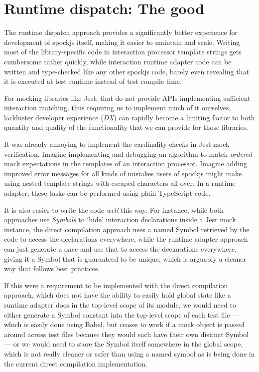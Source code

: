 \section{Runtime dispatch: The good}
The runtime dispatch approach
provides a significantly better experience
for development of spockjs itself,
making it easier to maintain and scale.
Writing most of the library-specific code
in interaction processor template strings
gets cumbersome rather quickly,
while interaction runtime adapter code
can be written and type-checked
like any other spockjs code,
barely even revealing that
it is executed at test runtime
instead of test compile time.

For mocking libraries like Jest,
that do not provide APIs
implementing sufficient interaction matching,
thus requiring us to implement much of it ourselves,
lackluster developer experience (\textit{DX})
can rapidly become a limiting factor to both quantity and quality
of the functionality that we can provide for those libraries.

It was already annoying to implement
the cardinality checks in Jest mock verification.
Imagine implementing and debugging an algorithm
to match \textit{ordered} mock expectations
in the templates of an interaction processor.
Imagine adding improved error messages for
all kinds of mistakes users of spockjs might make
using nested template strings
with escaped characters all over.
In a runtime adapter,
these tasks can be performed
using plain TypeScript code.

It is also easier to write the code \textit{well} this way.
For instance, while both approaches use \textit{Symbols} \autocite{MdnSymbol}
to `hide' interaction declarations inside a Jest mock instance,
the direct compilation approach uses
a named Symbol retrieved by the code
to access the declarations everywhere,
while the runtime adapter approach can just
generate a  once and use that
to access the declarations everywhere,
giving it a Symbol that is guaranteed to be unique,
which is arguably a cleaner way that follows best practices.

If this were a requirement to be implemented with the direct compilation approach,
which does not have the ability to easily hold global state
like a runtime adapter does in the top-level scope of its module,
we would need to either generate a Symbol constant
into the top-level scope of each test file
--- which is easily done using Babel,
but ceases to work if a mock object is passed around across test files
because they would each have their own distinct Symbol ---
or we would need to store the Symbol itself
somewhere in the global scope,
which is not really cleaner or safer than using a named symbol
as is being done in the current direct compilation implementation.

